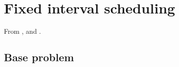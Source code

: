 \documentclass[a4paper,11pt]{article}
\begin{document}


\clearpage

\section{Fixed interval scheduling}

    From \cite{Smet2015}, \cite{Kolen2007} and \cite{Kovalyov2007}.


    \subsection{Base problem}
\end{document}
